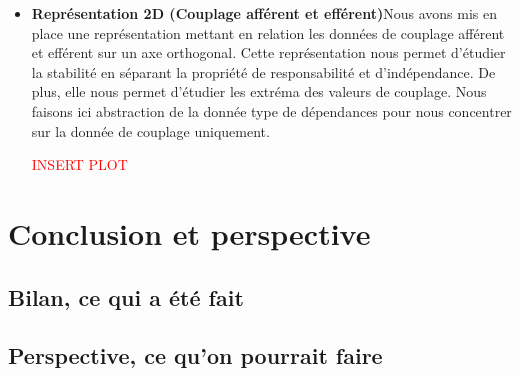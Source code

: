 \documentclass{scrartcl}
\begin{document}
\begin{itemize}
        \item \textbf{Représentation 2D (Couplage afférent et efférent)}Nous avons mis en place une représentation mettant en relation les données de couplage afférent et efférent sur un axe orthogonal. Cette représentation nous permet d'étudier la stabilité en séparant la propriété de responsabilité et d'indépendance. De plus, elle nous permet d'étudier les extréma des valeurs de couplage. Nous faisons ici abstraction de la donnée type de dépendances pour nous concentrer sur la donnée de couplage uniquement.
        \begin{center} \textcolor{red}{INSERT PLOT} \end{center}
    \end{itemize}


\newpage
\section{Conclusion et perspective}
    \subsection{Bilan, ce qui a été fait}
    \subsection{Perspective, ce qu'on pourrait faire}


\pagebreak


\end{document}
